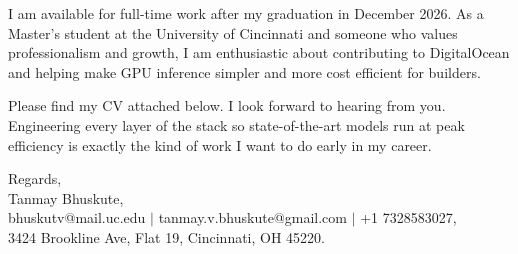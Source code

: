 \documentclass[11pt]{letter}
\begin{document}
\begin{letter}{}
I am available for full-time work after my graduation in December 2026. As a Master's student at the University of Cincinnati and someone who values professionalism and growth, I am enthusiastic about contributing to DigitalOcean and helping make GPU inference simpler and more cost efficient for builders.

Please find my CV attached below. I look forward to hearing from you. Engineering every layer of the stack so state-of-the-art models run at peak efficiency is exactly the kind of work I want to do early in my career.

{\setlength{\parskip}{0pt}
Regards,\\
Tanmay Bhuskute,\\
bhuskutv@mail.uc.edu $\mid$ tanmay.v.bhuskute@gmail.com $\mid$ +1 7328583027,\\
3424 Brookline Ave, Flat 19, Cincinnati, OH 45220.
}

\end{letter}
\end{document}
